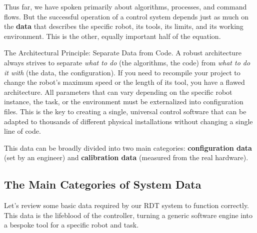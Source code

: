 Thus far, we have spoken primarily about algorithms, processes, and command flows. But the successful operation of a control system depends just as much on the \textbf{data} that describes the specific robot, its tools, its limits, and its working environment. This is the other, equally important half of the equation.

\begin{principlebox}{The Architectural Principle: Separate Data from Code.}
    A robust architecture always strives to separate \textit{what to do} (the algorithms, the code) from \textit{what to do it with} (the data, the configuration). If you need to recompile your project to change the robot's maximum speed or the length of its tool, you have a flawed architecture. All parameters that can vary depending on the specific robot instance, the task, or the environment must be externalized into configuration files. This is the key to creating a single, universal control software that can be adapted to thousands of different physical installations without changing a single line of code.
\end{principlebox}

This data can be broadly divided into two main categories: \textbf{configuration data} (set by an engineer) and \textbf{calibration data} (measured from the real hardware).

\subsection{The Main Categories of System Data}
\label{subsec:data_categories}


Let's review some basic data required by our RDT system to function correctly. This data is the lifeblood of the controller, turning a generic software engine into a bespoke tool for a specific robot and task.


